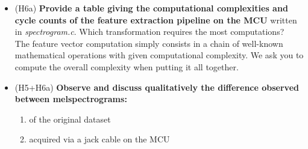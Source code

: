\begin{itemize}
    \item (H6a) \textbf{Provide a table giving the computational complexities and cycle counts of the feature extraction pipeline on the MCU} written in \emph{spectrogram.c}. Which transformation requires the most computations? \\
The feature vector computation simply consists in a chain of well-known mathematical operations with given computational complexity. We ask you to compute the overall complexity when putting it all together.
\item (H5+H6a) \textbf{Observe and discuss qualitatively the difference observed between melspectrograms:}
\begin{enumerate}
    \item of the original dataset
    \item acquired via a jack cable on the MCU

\end{enumerate}
\end{itemize}
